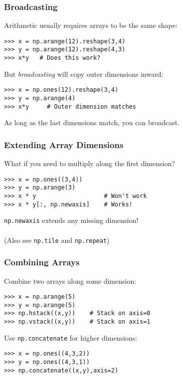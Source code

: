 \begin{frame}[fragile]\frametitle{Broadcasting}

    Arithmetic usually requires arrays to be the same shape:
    \begin{lstlisting}
>>> x = np.arange(12).reshape(3,4)
>>> y = np.arange(12).reshape(4,3)
>>> x*y   # Does this work?
    \end{lstlisting}

    But \textit{broadcasting} will copy outer dimensions inward:
    \begin{lstlisting}
>>> x = np.ones(12).reshape(3,4)
>>> y = np.arange(4)
>>> x*y     # Outer dimension matches
    \end{lstlisting}
    As long as the last dimensions match, you can broadcast.
\end{frame}

\begin{frame}[fragile]\frametitle{Extending Array Dimensions}

    What if you need to multiply along the first dimension?
    \begin{lstlisting}
>>> x = np.ones((3,4))
>>> y = np.arange(3)
>>> x * y                   # Won't work
>>> x * y[:, np.newaxis]    # Works!
    \end{lstlisting}
    \lstinline|np.newaxis| extends any missing dimension!
    \\~\\
    (Also see \lstinline|np.tile| and \lstinline|np.repeat|)
\end{frame}

\begin{frame}[fragile]\frametitle{Combining Arrays}

    Combine two arrays along some dimension:
    \begin{lstlisting}
>>> x = np.arange(5)
>>> y = np.arange(5)
>>> np.hstack((x,y))    # Stack on axis=0
>>> np.vstack((x,y))    # Stack on axis=1
    \end{lstlisting}

    Use \lstinline|np.concatenate| for higher dimensions:
    \begin{lstlisting}
>>> x = np.ones((4,3,2))
>>> y = np.ones((4,3,1))
>>> np.concatenate((x,y),axis=2)
    \end{lstlisting}
\end{frame}

